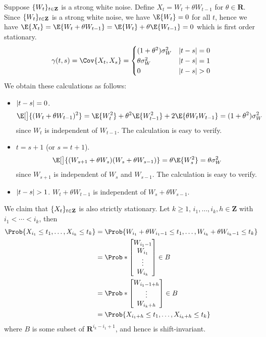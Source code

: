 \begin{Example}{}{}
    Suppose $ \{W_t\}_{t\in\mathbf{Z}} $ is a strong white noise.
    Define $ X_t=W_t+\theta W_{t-1} $ for $ \theta\in\mathbf{R} $.
    Since $ \{W_t\}_{t\in\mathbf{Z}} $ is a strong white noise, we
    have $ \E{W_t}=0 $ for all $ t $, hence we
    have $ \E{X_t}=\E{W_t+\theta W_{t-1}}=\E{W_t}+\theta\E{W_{t-1}}=0 $
    which is first order stationary.
    \[ \gamma(t,s)=\Cov{X_t,X_s}=\begin{cases}
            (1+\theta^2)\sigma_W^2 & \abs{t-s}=0 \\
            \theta\sigma_W^2       & \abs{t-s}=1 \\
            0                      & \abs{t-s}>0
        \end{cases} \]
    We obtain these calculations as follows:
    \begin{itemize}
        \item $ \lvert t-s\rvert=0 $.
              \[ \E[\big]{(W_t+\theta W_{t-1})^2}
                  =\E{W_t^2}+\theta^2\E{W_{t-1}^2}+2\E{\theta W_t W_{t-1}}
                  =(1+\theta^2)\sigma_W^2 \]
              since $ W_t $ is independent of $ W_{t-1} $. The calculation is easy to verify.
        \item $ t=s+1 $ (or $ s=t+1 $).
              \[ \E[\big]{(W_{s+1}+\theta W_s)(W_s+\theta W_{s-1})}=\theta\E{W_s^2}=\theta\sigma_W^2 \]
              since $ W_{s+1} $ is independent of $ W_s $ and $ W_{s-1} $.
              The calculation is easy to verify.
        \item $ \lvert t-s\rvert>1 $. $ W_t+\theta W_{t-1} $ is independent of
              $ W_s+\theta W_{s-1} $.
    \end{itemize}
    We claim that $ \{X_t\}_{t\in\mathbf{Z}} $ is also strictly stationary.
    Let $ k\ge 1 $, $ i_1,\ldots,i_k, h\in\mathbf{Z} $
    with $ i_1<\cdots<i_k $, then
    \begin{align*}
        \Prob{X_{i_1}\le t_1,\ldots,X_{i_k}\le t_k}
         & =\Prob{W_{i_1}+\theta W_{{i_1}-1}\le t_1,\ldots,W_{i_k}+\theta W_{{i_k}-1}\le t_k} \\
         & =\Prob*{\begin{bmatrix}
                W_{{i_1}-1} \\
                W_{i_1}     \\
                \vdots      \\
                W_{i_k}
            \end{bmatrix}\in B}                                           \\
         & =\Prob*{\begin{bmatrix}
                W_{{i_1-1}+h} \\
                \vdots        \\
                W_{{i_k}+h}
            \end{bmatrix}\in B}                                           \\
         & =\Prob{X_{{i_1}+h}\le t_1,\ldots,X_{{i_k}+h}\le t_k}
    \end{align*}
    where $ B $ is some subset of $ \mathbf{R}^{i_k-i_1+1} $, and hence
    is shift-invariant.
\end{Example}
